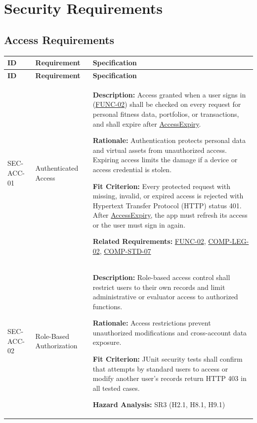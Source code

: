 \documentclass[12pt]{article}
\newcommand{\const}[1]{\hyperlink{const:#1}{\textsf{#1}}}
\newcommand{\acr}[3]{\phantomsection\label{acr:#1}#2 (#3)}
\begin{document}
\section{Security Requirements}
\subsection{Access Requirements}

\small
\setlength{\tabcolsep}{4pt}
\begin{xltabular}{\textwidth}{|p{2.6cm}|p{3.4cm}|X|}
\hline
\textbf{ID} & \textbf{Requirement} & \textbf{Specification} \\
\hline
\endfirsthead
\hline
\textbf{ID} & \textbf{Requirement} & \textbf{Specification} \\
\hline
\endhead

SEC-ACC-01\hypertarget{req:SEC-ACC-01}{} &
Authenticated Access &
\textbf{Description:} Access granted when a user signs in (\hyperlink{req:FUNC-02}{FUNC-02}) shall be checked on every request for personal fitness data, portfolios, or transactions, and shall expire after \const{AccessExpiry}.

\textbf{Rationale:} Authentication protects personal data and virtual assets from unauthorized access. Expiring access limits the damage if a device or access credential is stolen.

\textbf{Fit Criterion:} Every protected request with missing, invalid, or expired access is rejected with \acr{HTTP}{Hypertext Transfer Protocol}{HTTP} status 401. After \const{AccessExpiry}, the app must refresh its access or the user must sign in again.

\textbf{Related Requirements:} \hyperlink{req:FUNC-02}{FUNC-02}, \hyperlink{req:COMP-LEG-02}{COMP-LEG-02}, \hyperlink{req:COMP-STD-07}{COMP-STD-07}\\
\hline

SEC-ACC-02\hypertarget{req:SEC-ACC-02}{} &
Role-Based Authorization &
\textbf{Description:} Role-based access control shall restrict users to their own records and limit administrative or evaluator access to authorized functions.

\textbf{Rationale:} Access restrictions prevent unauthorized modifications and cross-account data exposure.

\textbf{Fit Criterion:} JUnit security tests shall confirm that attempts by standard users to access or modify another user's records return HTTP 403 in all tested cases.

\textbf{Hazard Analysis:} SR3 (H2.1, H8.1, H9.1) 


\end{xltabular}
\end{document}
